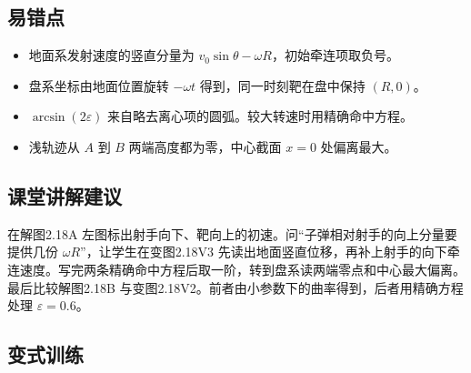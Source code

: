 \documentclass[UTF8,fontset=fandol,a4paper,11pt]{ctexart}
\begin{document}
\subsection*{易错点}

\begin{itemize}
\item 地面系发射速度的竖直分量为 $v_0\sin\theta-\omega R$，初始牵连项取负号。
\item 盘系坐标由地面位置旋转 $-\omega t$ 得到，同一时刻靶在盘中保持 $(R,0)$。
\item $\arcsin(2\varepsilon)$ 来自略去离心项的圆弧。较大转速时用精确命中方程。
\item 浅轨迹从 $A$ 到 $B$ 两端高度都为零，中心截面 $x=0$ 处偏离最大。
\end{itemize}



\subsection*{课堂讲解建议}

在解图2.18A 左图标出射手向下、靶向上的初速。问“子弹相对射手的向上分量要提供几份 $\omega R$”，让学生在变图2.18V3 先读出地面竖直位移，再补上射手的向下牵连速度。写完两条精确命中方程后取一阶，转到盘系读两端零点和中心最大偏离。最后比较解图2.18B 与变图2.18V2。前者由小参数下的曲率得到，后者用精确方程处理 $\varepsilon=0.6$。



\subsection*{变式训练}
\end{document}

